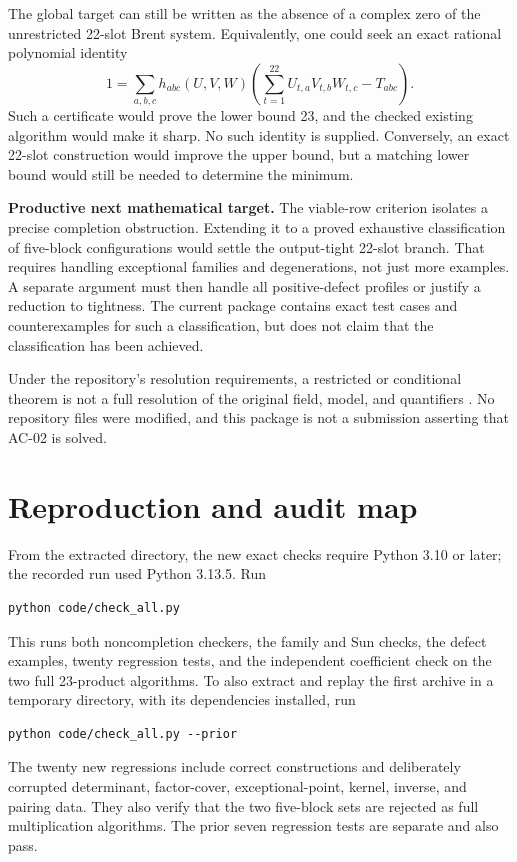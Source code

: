 \documentclass[11pt]{article}
\theoremstyle{definition}\newtheorem{definition}[theorem]{Definition}
\begin{document}
The global target can still be written as the absence of a complex zero of the unrestricted 22-slot Brent system. Equivalently, one could seek an exact rational polynomial identity
\[
1=\sum_{a,b,c}h_{abc}(U,V,W)
\left(\sum_{t=1}^{22}U_{t,a}V_{t,b}W_{t,c}-T_{abc}\right).
\]
Such a certificate would prove the lower bound 23, and the checked existing algorithm would make it sharp. No such identity is supplied. Conversely, an exact 22-slot construction would improve the upper bound, but a matching lower bound would still be needed to determine the minimum.

\textbf{Productive next mathematical target.} The viable-row criterion isolates a precise completion obstruction. Extending it to a proved exhaustive classification of five-block configurations would settle the output-tight 22-slot branch. That requires handling exceptional families and degenerations, not just more examples. A separate argument must then handle all positive-defect profiles or justify a reduction to tightness. The current package contains exact test cases and counterexamples for such a classification, but does not claim that the classification has been achieved.

Under the repository's resolution requirements, a restricted or conditional theorem is not a full resolution of the original field, model, and quantifiers \cite{contributing}. No repository files were modified, and this package is not a submission asserting that AC-02 is solved.

\section{Reproduction and audit map}\label{sec:repro}
From the extracted directory, the new exact checks require Python 3.10 or later; the recorded run used Python 3.13.5. Run
\begin{lstlisting}
python code/check_all.py
\end{lstlisting}
This runs both noncompletion checkers, the family and Sun checks, the defect examples, twenty regression tests, and the independent coefficient check on the two full 23-product algorithms. To also extract and replay the first archive in a temporary directory, with its dependencies installed, run
\begin{lstlisting}
python code/check_all.py --prior
\end{lstlisting}
The twenty new regressions include correct constructions and deliberately corrupted determinant, factor-cover, exceptional-point, kernel, inverse, and pairing data. They also verify that the two five-block sets are rejected as full multiplication algorithms. The prior seven regression tests are separate and also pass.
\end{document}
